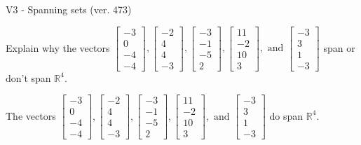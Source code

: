 \begin{exercise}
  \begin{exerciseTitle}V3 - Spanning sets (ver. 473)\end{exerciseTitle}
  \begin{exerciseStatement}
    Explain why the vectors \(\left[\begin{array}{r}
-3 \\
0 \\
-4 \\
-4
\end{array}\right] , \left[\begin{array}{r}
-2 \\
4 \\
4 \\
-3
\end{array}\right] , \left[\begin{array}{r}
-3 \\
-1 \\
-5 \\
2
\end{array}\right] , \left[\begin{array}{r}
11 \\
-2 \\
10 \\
3
\end{array}\right] , \text{ and } \left[\begin{array}{r}
-3 \\
3 \\
1 \\
-3
\end{array}\right]\) span or don't span \(\mathbb{R}^4\). 
	


  \end{exerciseStatement}
  \begin{exerciseAnswer}
   The vectors \(\left[\begin{array}{r}
-3 \\
0 \\
-4 \\
-4
\end{array}\right] , \left[\begin{array}{r}
-2 \\
4 \\
4 \\
-3
\end{array}\right] , \left[\begin{array}{r}
-3 \\
-1 \\
-5 \\
2
\end{array}\right] , \left[\begin{array}{r}
11 \\
-2 \\
10 \\
3
\end{array}\right] , \text{ and } \left[\begin{array}{r}
-3 \\
3 \\
1 \\
-3
\end{array}\right]\) 
  	 do  
	span \(\mathbb{R}^4\).
  



\end{exerciseAnswer}
\end{exercise}
